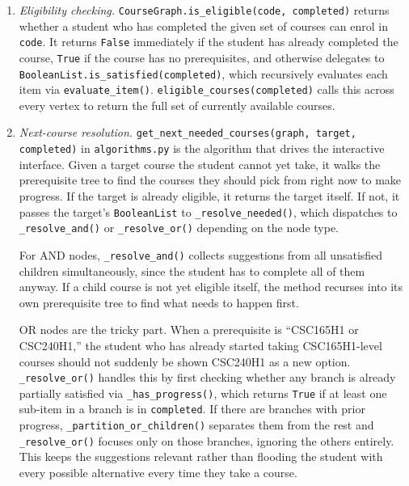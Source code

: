 \documentclass[11pt]{article}
\begin{document}
\begin{enumerate}

    \item \textit{Eligibility checking.}
    \verb|CourseGraph.is_eligible(code, completed)| returns whether a student who has
    completed the given set of courses can enrol in \verb|code|. It returns \verb|False|
    immediately if the student has already completed the course, \verb|True| if the course
    has no prerequisites, and otherwise delegates to
    \verb|BooleanList.is_satisfied(completed)|, which recursively evaluates each item via
    \verb|evaluate_item()|. \verb|eligible_courses(completed)| calls this across every vertex
    to return the full set of currently available courses.

    \item \textit{Next-course resolution.}
    \verb|get_next_needed_courses(graph, target, completed)| in \verb|algorithms.py| is the
    algorithm that drives the interactive interface. Given a target course the student cannot
    yet take, it walks the prerequisite tree to find the courses they should pick from right
    now to make progress. If the target is already eligible, it returns the target itself. If
    not, it passes the target's \verb|BooleanList| to \verb|_resolve_needed()|, which
    dispatches to \verb|_resolve_and()| or \verb|_resolve_or()| depending on the node type.

    For AND nodes, \verb|_resolve_and()| collects suggestions from all unsatisfied children
    simultaneously, since the student has to complete all of them anyway. If a child course
    is not yet eligible itself, the method recurses into its own prerequisite tree to find
    what needs to happen first.

    OR nodes are the tricky part. When a prerequisite is ``CSC165H1 or CSC240H1,'' the
    student who has already started taking CSC165H1-level courses should not suddenly be
    shown CSC240H1 as a new option. \verb|_resolve_or()| handles this by first checking
    whether any branch is already partially satisfied via \verb|_has_progress()|, which
    returns \verb|True| if at least one sub-item in a branch is in \verb|completed|. If
    there are branches with prior progress, \verb|_partition_or_children()| separates them
    from the rest and \verb|_resolve_or()| focuses only on those branches, ignoring the
    others entirely. This keeps the suggestions relevant rather than flooding the student
    with every possible alternative every time they take a course.


\end{enumerate}
\end{document}
